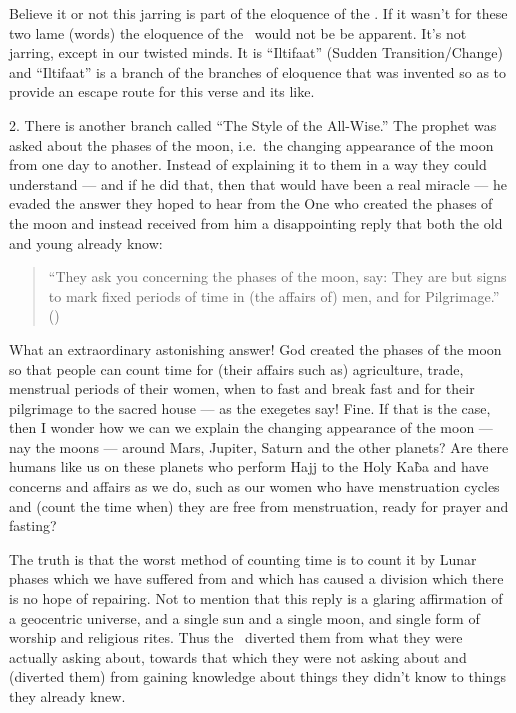 \documentclass[12pt]{memoir}
\begin{document}
Believe it or not this jarring is part of the eloquence of the \Quran.
If it wasn’t for these two lame (words) the eloquence of the \Quran\
would not be be apparent.
It’s not jarring, except in our twisted minds.
It is “Iltifaat” (Sudden Transition/Change) and “Iltifaat”
is a branch of the branches of eloquence that was invented
so as to provide an escape route for this verse and its like.

2. There is another branch called “The Style of the All-Wise.”
The prophet was asked about the phases of the moon,
i.e.\ the changing appearance of the moon from one day to another.
Instead of explaining it to them in a way they could understand —
and if he did that, then that would have been a real miracle —
he evaded the answer they hoped to hear from the One who created
the phases of the moon and instead received from him a disappointing reply
that both the old and young already know:

\begin{quote}
“They ask you concerning the phases of the moon, say:
They are but signs to mark fixed periods of time in (the affairs of) men,
and for Pilgrimage.”
()\fnmark
\end{quote}


What an extraordinary astonishing answer!
God created the phases of the moon so that people can count time for
(their affairs such as) agriculture, trade, menstrual periods of their women,
when to fast and break fast and for their pilgrimage to the sacred house —
as the exegetes say!
Fine. If that is the case,
then I wonder how we can we explain the changing appearance of the moon —
nay the moons — around Mars, Jupiter, Saturn and the other planets?
Are there humans like us on these planets who perform Hajj to the Holy Ka\`ba
and have concerns and affairs as we do, such as our women
who have menstruation cycles and (count the time when)
they are free from menstruation, ready for prayer and fasting?

The truth is that the worst method of counting time is to count it
by Lunar phases which we have suffered from and which has caused a division
which there is no hope of repairing.
Not to mention that this reply is a glaring affirmation
of a geocentric universe, and a single sun and a single moon,
and single form of worship and religious rites.
Thus the \Quran\ diverted them from what they were actually asking about,
towards that which they were not asking about and (diverted them)
from gaining knowledge about things they didn’t know
to things they already knew.
\end{document}
